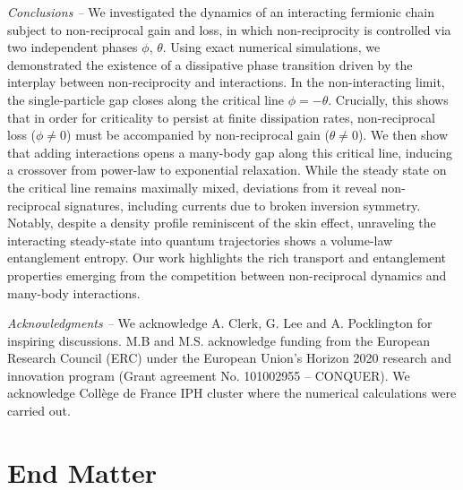 \documentclass[floatfix,reprint,amsmath,amssymb,superscriptaddress,aps,prl]{revtex4-2}
\begin{document}
\emph{Conclusions --} We investigated the dynamics of an interacting fermionic chain subject to non-reciprocal gain and loss, in which non-reciprocity is controlled via two independent phases $\phi$, $\theta$. Using exact numerical simulations, we demonstrated the existence of a dissipative phase transition driven by the interplay between non-reciprocity and interactions. In the non-interacting limit, the single-particle gap closes along the critical line $\phi=-\theta$.  Crucially, this shows that in order for criticality to persist at finite dissipation rates, non-reciprocal loss ($\phi \neq 0$) must be accompanied by non-reciprocal gain ($\theta \neq 0$).
We then show that adding interactions opens a many-body gap along this critical line, inducing a crossover from power-law to exponential relaxation. While the steady state on the critical line remains maximally mixed, deviations from it reveal non-reciprocal signatures, including currents due to broken inversion symmetry.  Notably, despite a density profile reminiscent of the skin effect, unraveling the interacting steady-state into quantum trajectories shows a volume-law entanglement entropy. Our work highlights the rich transport and entanglement properties emerging from the competition between non-reciprocal dynamics and many-body interactions.



\emph{Acknowledgments --} We acknowledge A. Clerk, G. Lee and A. Pocklington for inspiring discussions. M.B and M.S. acknowledge funding from the European Research Council (ERC) under the European Union's Horizon 2020 research and innovation program (Grant agreement No. 101002955 -- CONQUER). We acknowledge Coll\`{e}ge de France IPH cluster where the numerical calculations were carried out.




\section{End Matter}
\end{document}
